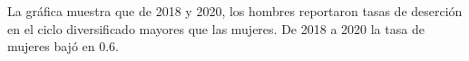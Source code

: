 La gráfica muestra que de 2018 y 2020, los hombres reportaron tasas de deserción en el ciclo diversificado mayores que las mujeres. De 2018 a 2020 la tasa de mujeres bajó en 0.6. 